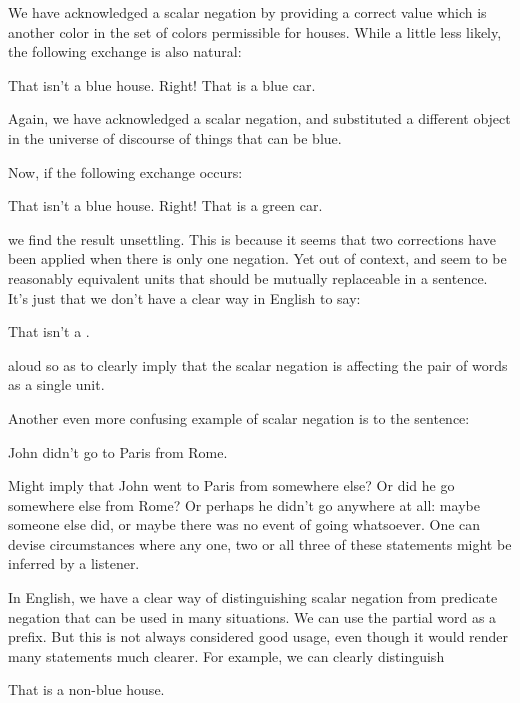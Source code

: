 We have acknowledged a scalar negation by providing a
    correct value which is another color in the set of colors
    permissible for houses. While a little less likely, the
    following exchange is also natural:
\begin{example}
That isn't a blue house.\n
Right! That is a blue car.
\end{example}

Again, we have acknowledged a scalar negation, and
    substituted a different object in the universe of discourse of
    things that can be blue.

Now, if the following exchange occurs:
\begin{example}
That isn't a blue house.\n
Right! That is a green car.
\end{example}

{\noindent}we find the result unsettling. This is because it seems that
    two corrections have been applied when there is only one
    negation. Yet out of context,  and 
    seem to be reasonably equivalent units that should be mutually
    replaceable in a sentence. It's just that we don't have a clear
    way in English to say:
\begin{example}
That isn't a .
\end{example}

{\noindent}aloud so as to clearly imply that the scalar negation is
    affecting the pair of words as a single unit. 

Another even more confusing example of scalar negation is to
    the sentence:
\begin{example}
John didn't go to Paris from Rome.
\end{example}

Might  imply that John went
    to Paris from somewhere else? Or did he go somewhere else from
    Rome? Or perhaps he didn't go anywhere at all: maybe someone
    else did, or maybe there was no event of going whatsoever. One
    can devise circumstances where any one, two or all three of
    these statements might be inferred by a listener.

In English, we have a clear way of distinguishing scalar
    negation from predicate negation that can be used in many
    situations. We can use the partial word  as a prefix.
    But this is not always considered good usage, even though it
    would render many statements much clearer. For example, we can
    clearly distinguish
\begin{example}
That is a non-blue house.
\end{example}

